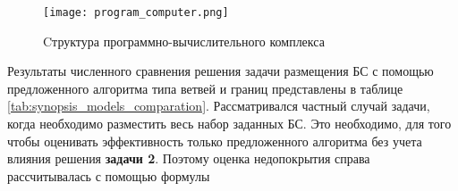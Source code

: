


\begin{figure}[h!]
    \centering
     \texttt{[image: program\_computer.png]}
  \caption{Cтруктура программно-вычислительного комплекса}
  \label{fig:synopsis_program_computer}
  \end{figure}

Результаты численного сравнения решения задачи размещения БС с помощью предложенного алгоритма  типа ветвей и границ представлены в таблице \cref{tab:synopsis_models_comparation}. Рассматривался частный случай задачи, когда необходимо разместить весь набор заданных БС. Это необходимо, для того чтобы оценивать эффективность только предложенного алгоритма без учета влияния решения \textbf{задачи 2}. Поэтому оценка недопокрытия справа рассчитывалась с помощью формулы

